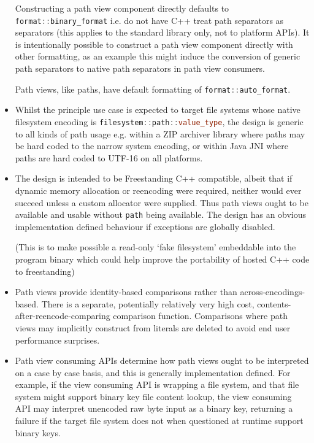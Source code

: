 \documentclass[11pt]{article}
\newcommand{\code}[2][cpp]{\lstinline[language=#1,basicstyle=\small\ttfamily]{#2}}
\begin{document}
\begin{itemize}
    Constructing a path view component directly defaults to \code{format::binary_format} i.e. do not have C++ treat path separators as separators (this applies to the standard library only, not to platform APIs). It is intentionally possible to construct a path view component directly with other formatting, as an example this might induce the conversion of generic path separators to native path separators in path view consumers.
    
    Path views, like paths, have default formatting of \code{format::auto_format}.
    \item Whilst the principle use case is expected to target file systems whose native filesystem encoding is \code{filesystem::path::value_type}, the design is generic to all kinds of path usage e.g. within a ZIP archiver library where paths may be hard coded to the narrow system encoding, or within Java JNI where paths are hard coded to UTF-16 on all platforms.
    \item The design is intended to be Freestanding C++ compatible, albeit that if dynamic memory allocation or reencoding were required, neither would ever succeed unless a custom allocator were supplied. Thus path views ought to be available and usable without \code{path} being available. The design has an obvious implementation defined behaviour if exceptions are globally disabled.
    
    (This is to make possible a read-only `fake filesystem' embeddable into the program binary which could help improve the portability of hosted C++ code to freestanding)
    \item Path views provide identity-based comparisons rather than across-encodings-based. There is a separate, potentially relatively very high cost, contents-after-reencode-comparing comparison function. Comparisons where path views may implicitly construct from literals are deleted to avoid end user performance surprises.
    \item Path view consuming APIs determine how path views ought to be interpreted on a case by case basis, and this is generally implementation defined. For example, if the view consuming API is wrapping a file system, and that file system might support binary key file content lookup, the view consuming API may interpret unencoded raw byte input as a binary key, returning a failure if the target file system does not when questioned at runtime support binary keys.
    

\end{itemize}
\end{document}
